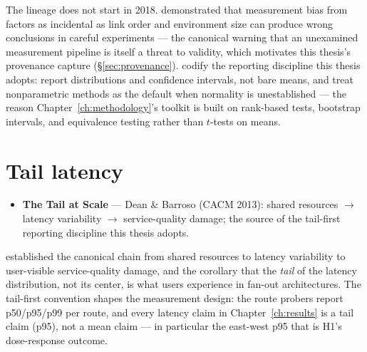 The lineage does not start in 2018. \citet{mytkowicz2009producing} demonstrated
that measurement bias from factors as incidental as link order and environment
size can produce wrong conclusions in careful experiments --- the canonical
warning that an unexamined measurement pipeline is itself a threat to validity,
which motivates this thesis's provenance capture (\S\ref{sec:provenance}).
\citet{hoefler2015scientific} codify the reporting discipline this thesis
adopts: report distributions and confidence intervals, not bare means, and
treat nonparametric methods as the default when normality is unestablished ---
the reason Chapter~\ref{ch:methodology}'s toolkit is built on rank-based tests,
bootstrap intervals, and equivalence testing rather than $t$-tests on means.

\section{Tail latency}\label{sec:tail-latency}

\begin{itemize}
\item \textbf{The Tail at Scale} --- Dean \& Barroso (CACM 2013): shared resources $\rightarrow$
  latency variability $\rightarrow$ service-quality damage; the source of the
  tail-first reporting discipline this thesis adopts.
\end{itemize}

\citet{dean2013tail} established the canonical chain from shared resources to
latency variability to user-visible service-quality damage, and the corollary
that the \emph{tail} of the latency distribution, not its center, is what users
experience in fan-out architectures. The tail-first convention shapes the
measurement design: the route probers report p50/p95/p99 per route, and every
latency claim in Chapter~\ref{ch:results} is a tail claim (p95), not a mean
claim --- in particular the east-west p95 that is H1's dose-response outcome.


